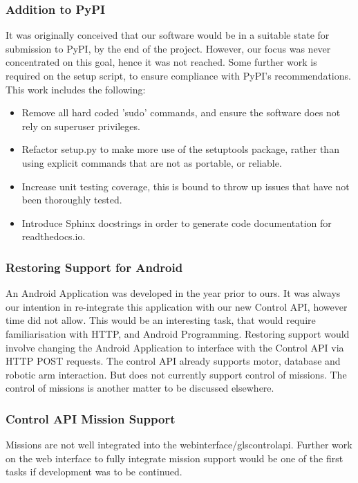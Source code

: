 \subsubsection{Addition to PyPI}
It was originally conceived that our software would be in a suitable state for submission to \gls{PyPI}, by the end of the project. However, our focus was never concentrated on this goal, hence it was not reached. Some further work is required on the setup script, to ensure compliance with \gls{PyPI}'s recommendations.
This work includes the following:
\begin{itemize}
\item Remove all hard coded 'sudo' commands, and ensure the software does not rely on superuser privileges.
\item Refactor setup.py to make more use of the setuptools package, rather than using explicit commands that are not as portable, or reliable.
\item Increase unit testing coverage, this is bound to throw up issues that have not been thoroughly tested.
\item Introduce Sphinx docstrings in order to generate code documentation for readthedocs.io.
\end{itemize}

\subsubsection{Restoring Support for Android}
An Android Application was developed in the year prior to ours. It was always our intention in re-integrate this application with our new Control API, however time did not allow. This would be an interesting task, that would require familiarisation with HTTP, and Android Programming.
\newline
Restoring support would involve changing the Android Application to interface with the Control API via \gls{HTTP} \gls{POST} requests. The control API already supports motor, database and robotic arm interaction. But does not currently support control of missions. The control of missions is another matter to be discussed elsewhere.

\subsubsection{Control API Mission Support}
Missions are not well integrated into the \gls{webinterface}/gls{controlapi}. Further work on the web interface to fully integrate mission support would be one of the first tasks if development was to be continued.

